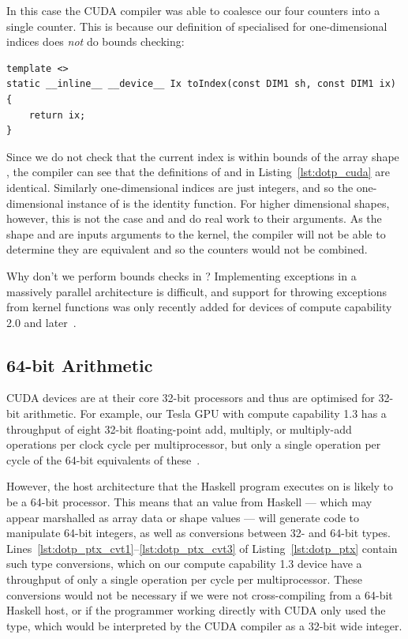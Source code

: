 In this case the CUDA compiler was able to coalesce our four counters into a
single counter. This is because our definition of  specialised for
one-dimensional indices  does \emph{not} do bounds checking:
%
\begin{lstlisting}[style=cuda]
template <>
static __inline__ __device__ Ix toIndex(const DIM1 sh, const DIM1 ix)
{
    return ix;
}
\end{lstlisting}
%
Since we do not check that the current index  is within bounds of the
array shape , the compiler can see that the definitions of 
and  in Listing~\ref{lst:dotp_cuda} are identical. Similarly
one-dimensional indices are just integers, and so the one-dimensional instance
of  is the identity function. For higher dimensional shapes,
however, this is not the case and  and  do real work
to their arguments. As the shape  and  are inputs
arguments to the kernel, the compiler will not be able to determine they are
equivalent and so the counters would not be combined.

Why don't we perform bounds checks in ? Implementing exceptions in
a massively parallel architecture is difficult, and support for throwing
exceptions from kernel functions was only recently added for devices of compute
capability 2.0 and later~\cite{NVIDIA:2012wf}. %


\subsection{64-bit Arithmetic}

CUDA devices are at their core 32-bit processors and thus are optimised for
32-bit arithmetic. For example, our Tesla GPU with compute capability 1.3 has a
throughput of eight 32-bit floating-point add, multiply, or multiply-add
operations per clock cycle per multiprocessor, but only a single operation per
cycle of the 64-bit equivalents of these~\cite{NVIDIA:2012wf}. %

However, the host architecture that the Haskell program executes on is likely to
be a 64-bit processor. This means that an  value from Haskell ---
which may appear marshalled as array data or shape values --- will generate code
to manipulate 64-bit integers, as well as conversions between 32- and 64-bit
types. Lines~\ref{lst:dotp_ptx_cvt1}--\ref{lst:dotp_ptx_cvt3} of
Listing~\ref{lst:dotp_ptx} contain such type conversions, which on our compute
capability 1.3 device have a throughput of only a single operation per cycle per
multiprocessor. These conversions would not be necessary if we were not
cross-compiling from a 64-bit Haskell host, or if the programmer working
directly with CUDA only used the  type, which would be interpreted by
the CUDA compiler as a 32-bit wide integer.


